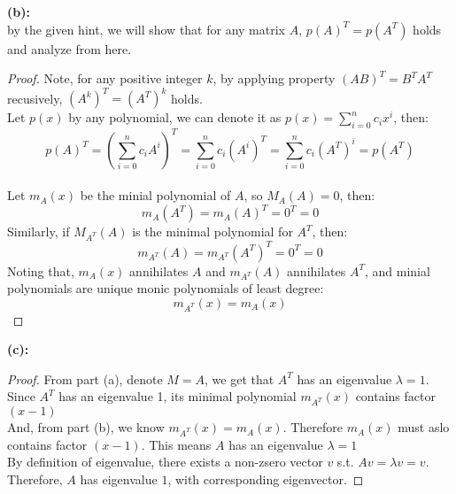 \documentclass{article}
\begin{document}
\textbf{(b): }
\\
by the given hint, we will show that for any matrix $A$, \( p(A)^T = p(A^T) \) holds and analyze from here.
\begin{proof}
    Note, for any positive integer $k$, by applying property \((AB)^T = B^TA^T\) recusively, \( (A^k)^T = (A^T)^k \) holds.
    \\
    Let $p(x)$ by any polynomial, we can denote it as \( p(x) = \sum_{i=0}^{n}c_i x^i\), then:
    \[ p(A)^T = \left( \sum_{i=0}^{n}c_i A^i \right)^T = \sum_{i=0}^{n}c_i (A^i)^T = \sum_{i=0}^{n}c_i (A^T)^i = p(A^T) \]
    \\
    Let $m_A(x)$ be the minial polynomial of $A$, so $M_A(A) = 0$, then:
    \[ m_A(A^T) = m_A(A)^T = 0^T = 0 \]
    Similarly, if $M_{A^T}(A)$ is the minimal polynomial for $A^T$, then:
    \[ m_{A^T}(A) = m_{A^T}(A^T)^T = 0^T = 0 \]
    Noting that, $m_A(x)$ annihilates $A$ and $m_{A^T}(A)$ annihilates $A^T$, and minial polynomials are unique monic polynomials of least degree:
    \[ m_{A^T}(x) = m_{A}(x) \]
\end{proof}

\textbf{(c): }
\begin{proof}
    From part (a), denote $M = A$, we get that $A^T$ has an eigenvalue $\lambda = 1$.
    \\
    Since $A^T$ has an eigenvalue 1, its minimal polynomial $m_{A^T}(x)$ contains factor $(x - 1)$
    \\
    And, from part (b), we know $m_{A^T}(x) = m_{A}(x)$. Therefore $m_{A}(x)$ must aslo contains factor $(x - 1)$. 
    This means $A$ has an eigenvalue $\lambda = 1$
    \\
    By definition of eigenvalue, there exists a non-zsero vector $v$ s.t. $Av = \lambda v = v$.
    \\
    Therefore, $A$ has eigenvalue $1$, with corresponding eigenvector.
\end{proof}
\end{document}
